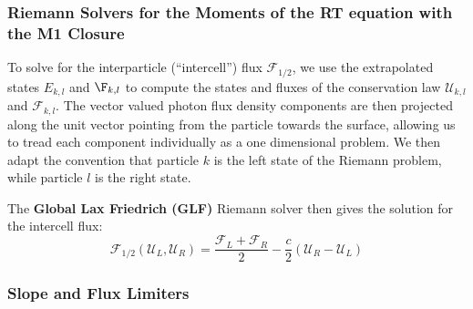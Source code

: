 %
%
%


\subsubsection{Riemann Solvers for the Moments of the RT equation with the M1
Closure} \label{chap:riemann}


To solve for the interparticle (``intercell'') flux $\mathcal{F}_{1/2}$, we use the extrapolated
states $E_{k,l}$ and $\F_{k,l}$ to compute the states and fluxes of the conservation law
$\mathcal{U}_{k,l}$ and $\mathcal{F}_{k,l}$. The vector valued photon flux density components are
then projected along the unit vector pointing from the particle towards the surface, allowing us to
tread each component individually as a one dimensional problem. We then adapt the convention that
particle $k$ is the left state of the Riemann problem, while particle $l$ is the right state.

The \textbf{Global Lax Friedrich (GLF)} Riemann solver \citep{ramses-rt13} then gives the
solution for the intercell flux:
\begin{equation}
	\mathcal{F}_{1/2}(\mathcal{U}_L, \mathcal{U}_R) =
		\frac{\mathcal{F}_{L} + \mathcal{F}_{R}}{2} -
		\frac{c}{2} \left(\mathcal{U}_R - \mathcal{U}_L \right) \label{eq:riemann-GLF}
\end{equation}









\subsubsection{Slope and Flux Limiters} \label{chap:limiters}

